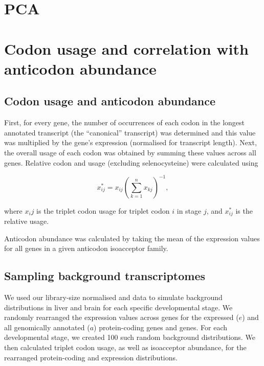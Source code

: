 \section{PCA}


\section{Codon usage and correlation with anticodon abundance}

\subsection{Codon usage and anticodon abundance}

First, for every gene, the number of occurrences of each codon in the longest
annotated transcript (the “canonical” transcript) was determined and this value
was multiplied by the gene’s expression (normalised for transcript length).
Next, the overall usage of each codon was obtained by summing these values
across all genes. Relative codon and usage (excluding selenocysteine) were
calculated using

\begin{equation}
    x_{ij}^* = x_{ij}\left(\sum_{k=1}^n x_{kj}\right)^{-1},
\end{equation}

where \(x_ij\) is the triplet codon usage for triplet codon \(i\) in stage
\(j\), and \(x_{ij}^*\) is the relative usage.

Anticodon abundance was calculated by taking the mean of the expression values
for all \trna genes in a given anticodon isoacceptor family.

\subsection{Sampling background transcriptomes}

We used our library-size normalised \rnaseq and  \chipseq data to simulate
background distributions in liver and brain for each specific developmental
stage. We randomly rearranged the expression values across genes for the
expressed (\(e\)) and all genomically annotated (\(a\)) protein-coding genes and
\trna genes. For each developmental stage, we created \num{100} such random
background distributions. We then calculated triplet codon usage, as well as
isoacceptor abundance, for the rearranged protein-coding \rna and \trna
expression distributions.

